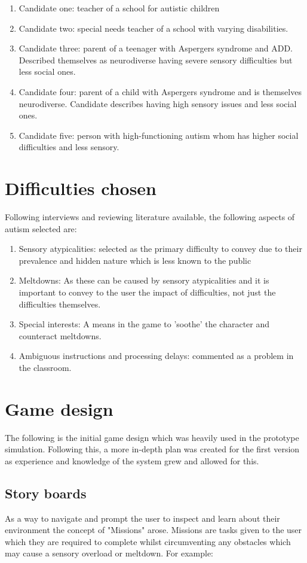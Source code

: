 \documentclass[11pt]{report}
\begin{document}
\begin{enumerate}
\item Candidate one: teacher of a school for autistic children
\item Candidate two: special needs teacher of a school with varying disabilities.
\item Candidate three: parent of a teenager with Aspergers syndrome and ADD. Described themselves as neurodiverse having severe sensory difficulties but less social ones.
\item Candidate four: parent of a child with Aspergers syndrome and is themselves neurodiverse. Candidate describes having high sensory issues and less social ones.
\item Candidate five: person with high-functioning autism whom has higher social difficulties and less sensory.
\end{enumerate}

\section{Difficulties chosen}
Following interviews and reviewing literature available, the following aspects of autism selected are:

\begin{enumerate}
\item Sensory atypicalities: selected as the primary difficulty to convey due to their prevalence and hidden nature which is less known to the public
\item Meltdowns: As these can be caused by sensory atypicalities and it is important to convey to the user the impact of difficulties, not just the difficulties themselves.
\item Special interests: A means in the game to 'soothe' the character and counteract meltdowns.
\item Ambiguous instructions and processing delays: commented as a problem in the classroom.
\end{enumerate}

\section{Game design}
The following is the initial game design which was heavily used in the prototype simulation. Following this, a more in-depth plan was created for the first version as experience and knowledge of the system grew and allowed for this.

\subsection{Story boards}
As a way to navigate and prompt the user to inspect and learn about their environment the concept of "Missions" arose. Missions are tasks given to the user which they are required to complete whilst circumventing any obstacles which may cause a sensory overload or meltdown. For example:
\end{document}
